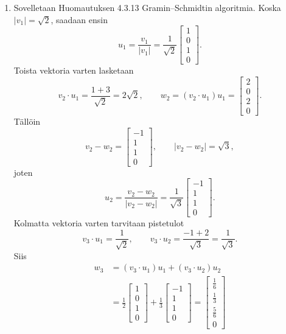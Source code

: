 \documentclass[11pt,a4paper]{amsart}
\begin{document}
\begin{solution}
\begin{enumerate}[label=(\alph*), leftmargin=*]
    \item Sovelletaan Huomautuksen 4.3.13 Gramin--Schmidtin
      algoritmia. Koska \(|v_1|=\sqrt2\), saadaan ensin
      \[
        u_1=\frac{v_1}{|v_1|}
        =\frac1{\sqrt2}
        \begin{bmatrix}1 \\ 0 \\ 1 \\ 0
        \end{bmatrix}.
      \]
      Toista vektoria varten lasketaan
      \[
        v_2\cdot u_1=\frac{1+3}{\sqrt2}=2\sqrt2,
        \qquad
        w_2=(v_2\cdot u_1)u_1
        =
        \begin{bmatrix}2 \\ 0 \\ 2 \\ 0
        \end{bmatrix}.
      \]
      Tällöin
      \[
        v_2-w_2=
        \begin{bmatrix}-1 \\ 1 \\ 1 \\ 0
        \end{bmatrix},
        \qquad |v_2-w_2|=\sqrt3,
      \]
      joten
      \[
        u_2=\frac{v_2-w_2}{|v_2-w_2|}
        =\frac1{\sqrt3}
        \begin{bmatrix}-1 \\ 1 \\ 1 \\ 0
        \end{bmatrix}.
      \]
      Kolmatta vektoria varten tarvitaan pistetulot
      \[
        v_3\cdot u_1=\frac1{\sqrt2},
        \qquad
        v_3\cdot u_2=\frac{-1+2}{\sqrt3}=\frac1{\sqrt3}.
      \]
      Siis
      \[
        \begin{aligned}
          w_3&=(v_3\cdot u_1)u_1+(v_3\cdot u_2)u_2 \\[0.5ex]
          &=\frac12
          \begin{bmatrix}1 \\ 0 \\ 1 \\ 0
          \end{bmatrix}
          +\frac13
          \begin{bmatrix}-1 \\ 1 \\ 1 \\ 0
          \end{bmatrix}
          =
          \begin{bmatrix}\frac16 \\ \frac13 \\ \frac56 \\ 0

\end{bmatrix}
\end{aligned}\]
\end{enumerate}
\end{solution}
\end{document}
